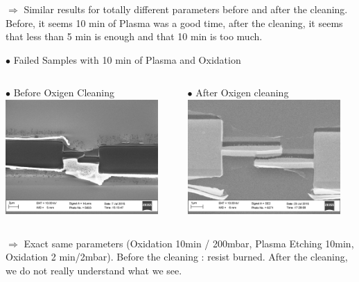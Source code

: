 \documentclass[handout]{beamer}
\begin{document}
\begin{frame}[allowframebreaks]
        \vspace{0.5cm}
        
        $\Longrightarrow$ Similar results for totally different parameters before and after the cleaning. Before, it seems 10 min of Plasma was a good time, after the cleaning, it seems that less than 5 min is enough and that 10 min is too much.
        \vspace{2cm}
                           
        $\bullet$  Failed Samples with 10 min of Plasma and Oxidation
        \vspace{0.2cm}
        
        \begin{columns}[onlytextwidth]
            \begin{column}{0.5\textwidth}
                $\bullet$ Before Oxigen Cleaning\\
                \includegraphics[width=165pt]{Burned2.png}
            \end{column}
            
            \begin{column}{0.5\textwidth}
                $\bullet$ After Oxigen cleaning\\
                \includegraphics[width=165pt]{Burned1.png}
            \end{column}
        \end{columns}
        $\Longrightarrow$ Exact same parameters (Oxidation 10min / 200mbar, Plasma Etching 10min, Oxidation 2 min/2mbar). Before the cleaning : resist burned. After the cleaning, we do not really understand what we see.
         \vspace{2cm}
               

\end{frame}
\end{document}
